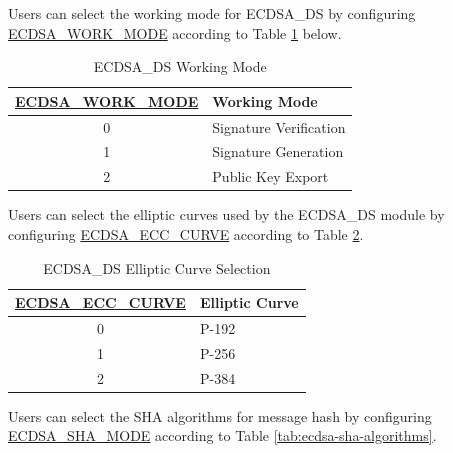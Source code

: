 \documentclass[main\_\_EN.tex]{subfiles}
\begin{document}
Users can select the working mode for ECDSA\_DS by configuring \hyperref[fielddesc:ECDSAWORKMODE]{ECDSA\_WORK\_MODE} according to Table \ref{tab:ecdsa-working-mode} below.

\begin{table}[H]
    \centering
    \caption{ECDSA\_DS Working Mode}
    \label{tab:ecdsa-working-mode}
    \begin{tabular}{ | c | l | }
    \hline
        \rowcolor{lightgray}
        \textbf{\hyperref[fielddesc:ECDSAWORKMODE]{ECDSA\_WORK\_MODE}}      & \textbf{Working Mode}\\\hline
        0                       & Signature Verification    \\\hline
        1                       & Signature Generation      \\\hline
        2                       & Public Key Export         \\\hline
    \end{tabular}
\end{table}

Users can select the elliptic curves used by the ECDSA\_DS module by configuring \hyperref[fielddesc:ECDSAECCCURVE]{ECDSA\_ECC\_CURVE} according to Table \ref{tab:ecdsa-curve-selection}.

\begin{table}[H]
    \centering
    \caption{ECDSA\_DS Elliptic Curve Selection}
    \label{tab:ecdsa-curve-selection}
    \begin{tabular}{ | c | l | }
    \hline
        \rowcolor{lightgray}
        \textbf{\hyperref[fielddesc:ECDSAECCCURVE]{ECDSA\_ECC\_CURVE}}      & \textbf{Elliptic Curve}\\
        \hline
        0                       & P-192    \\\hline
        1                       & P-256    \\\hline
        2                       & P-384    \\\hline
    \end{tabular}
\end{table}

Users can select the SHA algorithms for message hash by configuring \hyperref[fielddesc:ECDSASHAMODE]{ECDSA\_SHA\_MODE} according to Table \ref{tab:ecdsa-sha-algorithms}.
\end{document}
